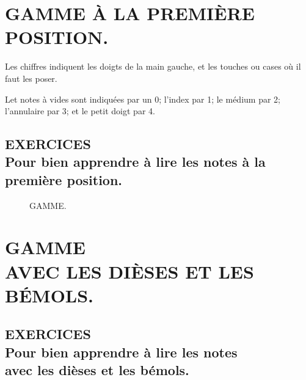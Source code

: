 \documentclass[a4paper]{book}
\begin{document}
\chapter[La Gamme et des exercices pour bien apprendre à lire les notes à\\
la première position]{%
  GAMME À LA PREMIÈRE POSITION.}

Les chiffres indiquent les doigts de la main gauche, et les touches ou cases où il faut les poser.

Let notes à vides sont indiquées par un 0; l'index par 1; le médium par 2; l'annulaire par 3; et le petit doigt par 4.

\begin{figure}[h]
  \centering
  \label{fig:first-position}
\end{figure}

\section*{EXERCICES\\
  Pour bien apprendre à lire les notes à la première position.}

\begin{figure}[h]
  \centering
  \caption{\normalsize GAMME.}
  \label{fig:scale}
\end{figure}
\clearpage


\chapter[Gammes avec les dièses et les bémols, et un exercices]{%
  GAMME\\
  \footnotesize AVEC LES DIÈSES ET LES BÉMOLS.}

\begin{figure}[h]
  \centering
  \label{fig:first-position-chromatic}
\end{figure}

\section*{EXERCICES\\
  Pour bien apprendre à lire les notes\\
  avec les dièses et les bémols.}
\end{document}

